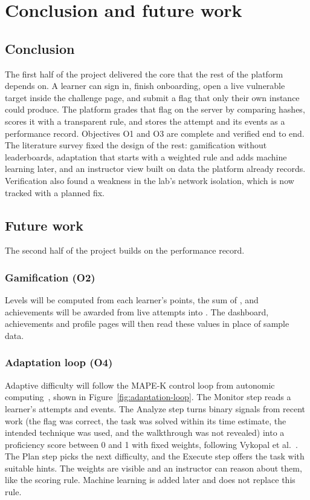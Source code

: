 \chapter{Conclusion and future work}
\label{ch:conclusion}

\section{Conclusion}

The first half of the project delivered the core that the rest of the platform depends on. A learner can sign in, finish onboarding, open a live vulnerable target inside the challenge page, and submit a flag that only their own instance could produce. The platform grades that flag on the server by comparing hashes, scores it with a transparent rule, and stores the attempt and its events as a performance record. Objectives O1 and O3 are complete and verified end to end. The literature survey fixed the design of the rest: gamification without leaderboards, adaptation that starts with a weighted rule and adds machine learning later, and an instructor view built on data the platform already records. Verification also found a weakness in the lab's network isolation, which is now tracked with a planned fix.

\section{Future work}

The second half of the project builds on the performance record.

\subsection{Gamification (O2)}

Levels will be computed from each learner's points, the sum of , and achievements will be awarded from live attempts into . The dashboard, achievements and profile pages will then read these values in place of sample data.

\subsection{Adaptation loop (O4)}
\label{sec:future-adaptation}

Adaptive difficulty will follow the MAPE-K control loop from autonomic computing~\cite{Kephart2003vision}, shown in Figure~\ref{fig:adaptation-loop}. The Monitor step reads a learner's attempts and events. The Analyze step turns binary signals from recent work (the flag was correct, the task was solved within its time estimate, the intended technique was used, and the walkthrough was not revealed) into a proficiency score between 0 and 1 with fixed weights, following Vykopal et al.~\cite{Vykopal2023smart}. The Plan step picks the next difficulty, and the Execute step offers the task with suitable hints. The weights are visible and an instructor can reason about them, like the scoring rule. Machine learning is added later and does not replace this rule.

